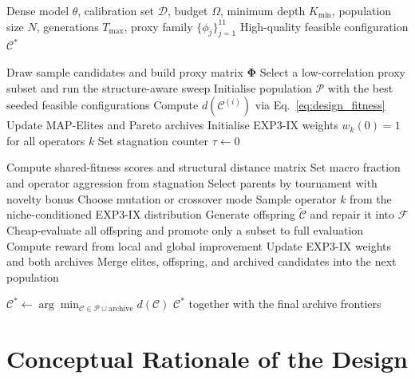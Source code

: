 \begin{algorithm}[H]
  \caption{Structured Pruning Configuration Search}
  \label{alg:full_search}
  \begin{algorithmic}[1]
    \REQUIRE Dense model $\theta$, calibration set $\mathcal{D}$, budget $\Omega$, minimum depth $K_{\min}$,
             population size $N$, generations $T_{\max}$, proxy family $\{\phi_j\}_{j=1}^{11}$
    \ENSURE High-quality feasible configuration $\mathcal{C}^*$

    \STATE Draw sample candidates and build proxy matrix $\bm{\Phi}$
    \STATE Select a low-correlation proxy subset and run the structure-aware sweep
    \STATE Initialise population $\mathcal{P}$ with the best seeded feasible configurations
      \STATE Compute $d(\mathcal{C}^{(i)})$ via Eq.~\eqref{eq:design_fitness}
      \STATE Update MAP-Elites and Pareto archives
    \ENDFOR
    \STATE Initialise EXP3-IX weights $w_k(0) = 1$ for all operators $k$
    \STATE Set stagnation counter $\tau \gets 0$

      \STATE Compute shared-fitness scores and structural distance matrix
      \STATE Set macro fraction and operator aggression from stagnation
      \STATE Select parents by tournament with novelty bonus
        \STATE Choose mutation or crossover mode
        \STATE Sample operator $k$ from the niche-conditioned EXP3-IX distribution
        \STATE Generate offspring $\widetilde{\mathcal{C}}$ and repair it into $\mathcal{F}$
      \ENDFOR
      \STATE Cheap-evaluate all offspring and promote only a subset to full evaluation
        \STATE Compute reward from local and global improvement
        \STATE Update EXP3-IX weights and both archives
      \ENDFOR
      \STATE Merge elites, offspring, and archived candidates into the next population
    \ENDFOR

    \STATE $\mathcal{C}^* \leftarrow \arg\min_{\mathcal{C} \in \mathcal{P} \cup \text{archive}} d(\mathcal{C})$
    \RETURN $\mathcal{C}^*$ together with the final archive frontiers
  \end{algorithmic}
\end{algorithm}

\section{Conceptual Rationale of the Design}
\label{subsec:justification}

